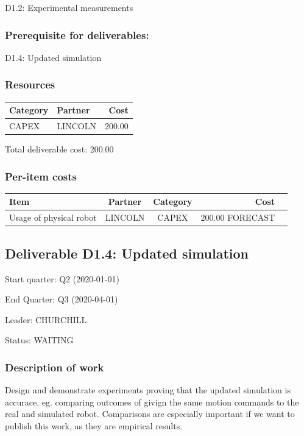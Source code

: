 \documentclass[english]{article}
\begin{document}
D1.2: Experimental measurements



\subsubsection*{Prerequisite for deliverables:}

D1.4: Updated simulation



\subsubsection*{Resources}

\begin{tabular}{ | l | l | r | }
\hline
 Category & Partner & Cost \\ 
 \hline
 CAPEX & LINCOLN &  200.00 \\ 
\hline
 \end{tabular}

Total deliverable cost:  200.00

\subsubsection*{Per-item costs}

\begin{tabular}{ | l | c | c | r | c | }
\hline
 Item & Partner & Category & Cost \\ 
 \hline
 Usage of physical robot & LINCOLN & CAPEX & 200.00 FORECAST\\ 
\hline
 \end{tabular}

\newpage\subsection*{Deliverable D1.4: Updated simulation}

Start quarter: Q2 (2020-01-01) 
 
 End Quarter: Q3 (2020-04-01) 

 Leader: CHURCHILL

  Status: WAITING 

 \subsubsection*{Description of work}

Design and demonstrate experiments proving that the updated simulation is accurace, eg. comparing outcomes of givign the same motion commands to the real and simulated robot. Comparisons are especially important if we want to publish this work, as they are empirical results.
\end{document}
